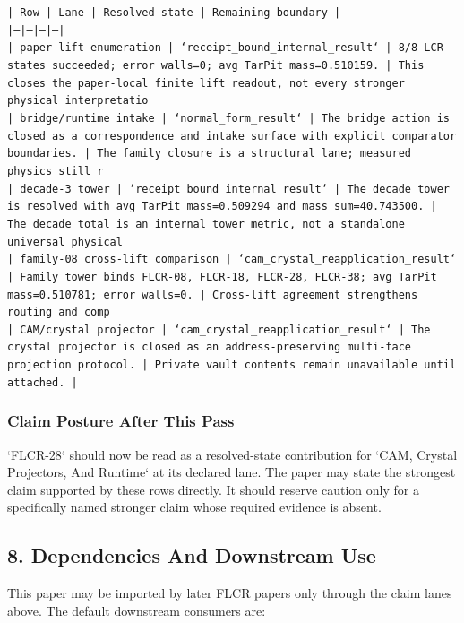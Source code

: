 \documentclass[11pt]{article}
\begin{document}
\noindent\texttt{| Row | Lane | Resolved state | Remaining boundary |}\\
\noindent\texttt{|---|---|---|---|}\\
\noindent\texttt{| paper lift enumeration | `receipt\_bound\_internal\_result` | 8/8 LCR states succeeded; error walls=0; avg TarPit mass=0.510159. | This closes the paper-local finite lift readout, not every stronger physical interpretatio}\\
\noindent\texttt{| bridge/runtime intake | `normal\_form\_result` | The bridge action is closed as a correspondence and intake surface with explicit comparator boundaries. | The family closure is a structural lane; measured physics still r}\\
\noindent\texttt{| decade-3 tower | `receipt\_bound\_internal\_result` | The decade tower is resolved with avg TarPit mass=0.509294 and mass sum=40.743500. | The decade total is an internal tower metric, not a standalone universal physical }\\
\noindent\texttt{| family-08 cross-lift comparison | `cam\_crystal\_reapplication\_result` | Family tower binds FLCR-08, FLCR-18, FLCR-28, FLCR-38; avg TarPit mass=0.510781; error walls=0. | Cross-lift agreement strengthens routing and comp}\\
\noindent\texttt{| CAM/crystal projector | `cam\_crystal\_reapplication\_result` | The crystal projector is closed as an address-preserving multi-face projection protocol. | Private vault contents remain unavailable until attached. |}\\

\subsubsection*{Claim Posture After This Pass}

`FLCR-28` should now be read as a resolved-state contribution for `CAM, Crystal Projectors, And Runtime` at its declared lane. The paper may state the strongest claim supported by these rows directly. It should reserve caution only for a specifically named stronger claim whose required evidence is absent.

\subsection*{8. Dependencies And Downstream Use}

This paper may be imported by later FLCR papers only through the claim lanes
above. The default downstream consumers are:
\end{document}
